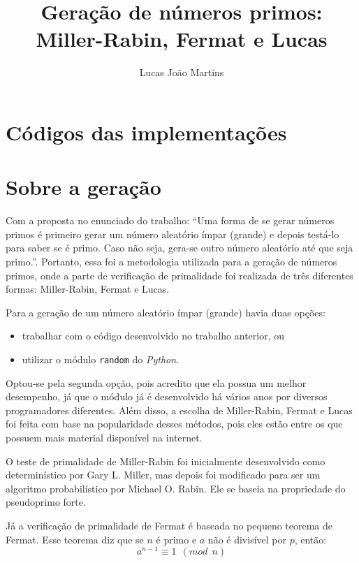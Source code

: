 \documentclass[12pt]{article}
\title{
  Geração de números primos: \\
  \large Miller-Rabin, Fermat e Lucas}
\author{Lucas João Martins}
\date{}
\begin{document}
\maketitle

\section{Códigos das implementações}






\section{Sobre a geração}
Com a proposta no enunciado do trabalho: ``Uma forma de se gerar números primos
é primeiro gerar um número aleatório ímpar (grande) e depois testá-lo para saber
se é primo. Caso não seja, gera-se outro número aleatório até que seja primo.''.
Portanto, essa foi a metodologia utilizada para a geração de números primos,
onde a parte de verificação de primalidade foi realizada de três diferentes
formas: Miller-Rabin, Fermat e Lucas.

Para a geração de um número aleatório ímpar (grande) havia duas opções:
\begin{itemize}
  \item trabalhar com o código desenvolvido no trabalho anterior, ou
  \item utilizar o módulo \lstinline{random} do \textit{Python}.
\end{itemize}

Optou-se pela segunda opção, pois acredito que ela possua um melhor desempenho,
já que o módulo já é desenvolvido há vários anos por diversos programadores
diferentes. Além disso, a escolha de Miller-Rabin, Fermat e Lucas foi feita com
base na popularidade desses métodos, pois eles estão entre os que possuem mais
material disponível na internet.

O teste de primalidade de Miller-Rabin foi inicialmente desenvolvido como determinístico por Gary L. Miller, mas depois foi modificado para ser um algoritmo probabilístico por Michael O. Rabin. Ele se baseia na propriedade do pseudoprimo forte.

Já a verificação de primalidade de Fermat é baseada no pequeno teorema de
Fermat. Esse teorema diz que se $n$ é primo e $a$ não é divisível por $p$,
então:
\begin{equation}
  a^{n-1} \equiv 1 \ \ (mod \ \ n)
\end{equation}
\end{document}
